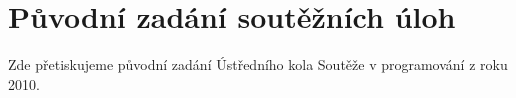 \appendix

\chapter{Původní zadání soutěžních úloh}

Zde přetiskujeme původní zadání Ústředního kola Soutěže v programování z roku
2010.



